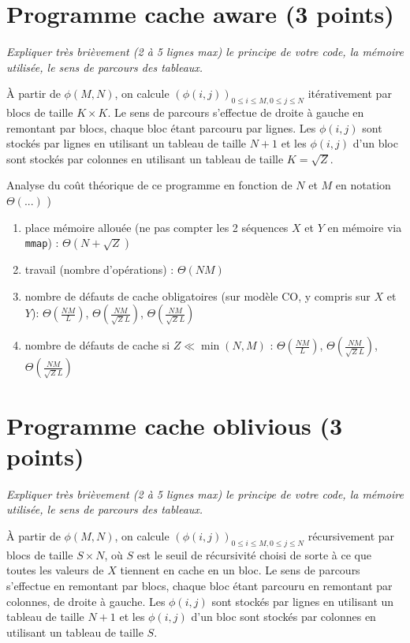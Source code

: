 \documentclass[10pt,a4paper]{article}
\begin{document}
\section{Programme cache aware  (3 points)}
{\em Expliquer très brièvement (2 à 5 lignes max) le principe de votre code, la mémoire utilisée, le sens de parcours des tableaux.}

\medskip

À partir de $\phi(M,N)$, on calcule $\left( \phi(i,j) \right)_{0 \leqslant i \leqslant M, 0 \leqslant j \leqslant N}$ itérativement par blocs de taille $K \times K$. Le sens de parcours s'effectue de droite à gauche en remontant par blocs, chaque bloc étant parcouru par lignes. Les $\phi(i,j)$ sont stockés par lignes en utilisant un tableau de taille $N+1$ et les $\phi(i,j)$ d'un bloc sont stockés par colonnes en utilisant un tableau de taille $K = \sqrt{Z}$.

\medskip

Analyse du coût théorique de ce programme en fonction de $N$ et $M$  en notation $\Theta(...)$ )
\begin{enumerate}
  \item place mémoire allouée (ne pas compter les 2 séquences $X$ et $Y$ en mémoire via {\tt mmap}) : $\Theta(N + \sqrt{Z})$
  \item travail (nombre d'opérations) : $\Theta(NM)$
  \item nombre de défauts de cache obligatoires (sur modèle CO, y compris sur $X$ et $Y$): $\Theta \left( \frac{NM}{L} \right)$, $\Theta \left( \frac{NM}{\sqrt{Z} L} \right)$, $\Theta \left( \frac{NM}{\sqrt{Z} L} \right)$
  \item nombre de défauts de cache si $Z \ll \min(N,M)$ : $\Theta \left( \frac{NM}{L} \right)$, $\Theta \left( \frac{NM}{\sqrt{Z} L} \right)$, $\Theta \left( \frac{NM}{\sqrt{Z} L} \right)$
\end{enumerate}

\section{Programme cache oblivious  (3 points)}
{\em Expliquer très brièvement (2 à 5 lignes max) le principe de votre code, la mémoire utilisée, le sens de parcours des tableaux.}

\medskip

À partir de $\phi(M,N)$, on calcule $\left( \phi(i,j) \right)_{0 \leqslant i \leqslant M, 0 \leqslant j \leqslant N}$ récursivement par blocs de taille $S \times N$, où $S$ est le seuil de récursivité choisi de sorte à ce que toutes les valeurs de $X$ tiennent en cache en un bloc. Le sens de parcours s'effectue en remontant par blocs, chaque bloc étant parcouru en remontant par colonnes, de droite à gauche. Les $\phi(i,j)$ sont stockés par lignes en utilisant un tableau de taille $N+1$ et les $\phi(i,j)$ d'un bloc sont stockés par colonnes en utilisant un tableau de taille $S$.
\end{document}
